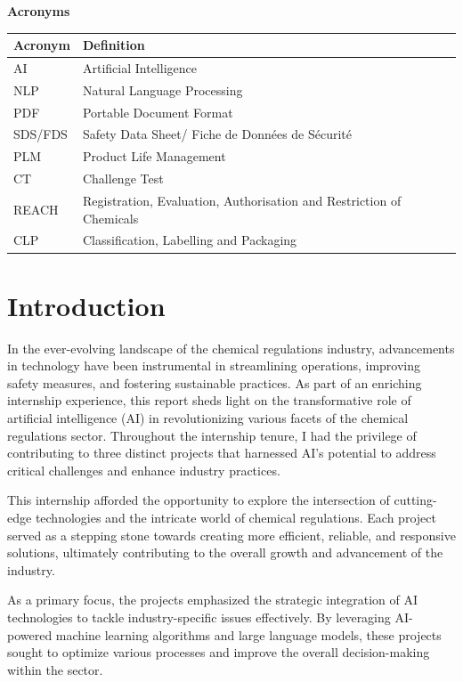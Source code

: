 \documentclass[a4paper,12pt,twoside]{report}
\newcommand{\acronym}[2]{#1 & #2\\}
\begin{document}
\newpage


\tableofcontents{}

\thispagestyle{empty}

\newpage

\listoffigures  %





\newpage
\thispagestyle{empty}
\begin{center}
    \Large\textbf{Acronyms}
\end{center}
\begin{longtable}{ll}
   \textbf{Acronym} & \textbf{Definition} \\
   \hline
   \acronym{AI}{Artificial Intelligence}
\acronym{NLP}{Natural Language Processing}
\acronym{PDF}{Portable Document Format}
\acronym{SDS/FDS}{Safety Data Sheet/ Fiche de Données de Sécurité}
\acronym{PLM}{Product Life Management}
\acronym{CT}{Challenge Test}
\acronym{REACH}{Registration, Evaluation, Authorisation and Restriction of Chemicals}
\acronym{CLP}{Classification, Labelling and Packaging}
\end{longtable}
\newpage
\chapter{Introduction}
In the ever-evolving landscape of the chemical regulations industry, advancements in technology have been instrumental in streamlining operations, improving safety measures, and fostering sustainable practices. As part of an enriching internship experience, this report sheds light on the transformative role of artificial intelligence (AI) in revolutionizing various facets of the chemical regulations sector. Throughout the internship tenure, I had the privilege of contributing to three distinct projects that harnessed AI's potential to address critical challenges and enhance industry practices.

This internship afforded the opportunity to explore the intersection of cutting-edge technologies and the intricate world of chemical regulations. Each project served as a stepping stone towards creating more efficient, reliable, and responsive solutions, ultimately contributing to the overall growth and advancement of the industry.

As a primary focus, the projects emphasized the strategic integration of AI technologies to tackle industry-specific issues effectively. By leveraging AI-powered machine learning algorithms and large language models, these projects sought to optimize various processes and improve the overall decision-making within the sector.
\end{document}
